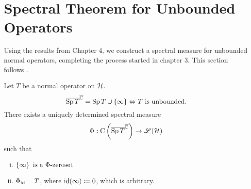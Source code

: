 \section{Spectral Theorem for Unbounded Operators}

Using the results from Chapter 4, we construct a spectral measure
for unbounded normal operators, completing the process started in chapter
3. This section follows \cite{LesHaupt}.
\begin{thrm}
 Let $T$ be a normal operator on $\mathcal{H}$.
 \[ 
 \overline{\operatorname{Sp} T}^{\overline{\mathbb{C}}} = \operatorname{Sp} T \cup \left\lbrace \infty \right\rbrace \Leftrightarrow T
 \text{ is unbounded.}
 \]
 There exists a uniquely determined spectral measure
 \[
  \Phi : \operatorname{C}\left( \overline{\operatorname{Sp} T }^{\overline{\mathbb{C}}} \right) \to \mathscr{L}(\mathcal{H})
 \]
 such that
 \begin{enumerate}[(i)]
  \item $
         \left\lbrace \infty \right\rbrace \text{ is a } \Phi\text{-zeroset}
        $
        
       
  \item $\Phi_{\operatorname{id}} = T$, where $\operatorname{id}(\infty) \coloneqq 0$, which is arbitrary.

  
 \end{enumerate}

\end{thrm}

